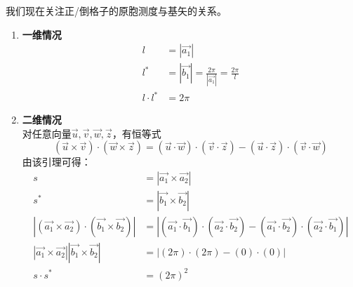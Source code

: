 \newpage
    我们现在关注正/倒格子的原胞测度与基矢的关系。
    \begin{enumerate}[itemsep=0pt,parsep=0pt]
        \item \textbf{一维情况}
        \begin{align*}
        l     &=\left\lvert\vec{a_1}\right\rvert\\
        l^\ast&=\left\lvert\vec{b_1}\right\rvert
               =\frac{2\pi}{\left\lvert\vec{a_1}\right\rvert}
               =\frac{2\pi}{l}\\
        l\cdot l^\ast &= 2\pi 
        \end{align*}

        \item \textbf{二维情况}\\
        对任意向量$\vec u,\vec v,\vec w,\vec z$，有恒等式
        \[
        (\vec u\times\vec v)\cdot(\vec w\times\vec z)
        =(\vec u\cdot\vec w)\cdot(\vec v\cdot\vec z)-(\vec u\cdot\vec z)\cdot(\vec v\cdot\vec w)
        \]
        由该引理可得：
        \begin{align*}
        s               &=\left\lvert\vec{a_1} \times \vec{a_2}\right\rvert\\
        s^\ast          &=\left\lvert\vec{b_1} \times \vec{b_2}\right\rvert\\
        \left\lvert(\vec{a_1} \times \vec{a_2})\cdot (\vec{b_1} \times \vec{b_2})\right\rvert&=\left\lvert(\vec{a_1}\cdot\vec{b_1})\cdot(\vec{a_2}\cdot\vec{b_2})-(\vec{a_1}\cdot\vec{b_2})\cdot(\vec{a_2}\cdot\vec{b_1})\right\rvert\\
        \left\lvert\vec{a_1} \times \vec{a_2}\right\rvert\left\lvert\vec{b_1} \times \vec{b_2}\right\rvert&=\left\lvert(2\pi)\cdot(2\pi)-(0)\cdot(0)\right\rvert\\
        s\cdot s^\ast   &= (2\pi)^2
        \end{align*}


\end{enumerate}
